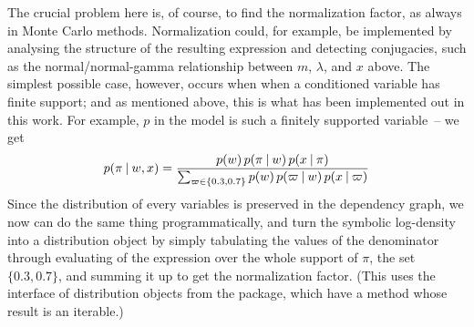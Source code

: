 The crucial problem here is, of course, to find the normalization factor, as always in Monte Carlo
methods.  Normalization could, for example, be implemented by analysing the structure of the
resulting expression and detecting conjugacies, such as the normal/normal-gamma relationship between
\(m\), \(\lambda\), and \(x\) above.  The simplest possible case, however, occurs when when a
conditioned variable has finite support; and as mentioned above, this is what has been implemented
out in this work.  For example, \(p\) in the  model is such a finitely
supported variable~-- we get
\begin{equation}
    p(\pi \:\vert\: w, x) = \frac{p(w) \, p(\pi \:\vert\: w) \, p(x \:\vert\: \pi)}{
      \sum_{\varpi \in \{0.3, 0.7\}}p(w) \, p(\varpi \:\vert\: w) \, p(x \:\vert\: \varpi)}
\end{equation}
Since the distribution of every variables is preserved in the dependency graph, we now can do the
same thing programmatically, and turn the symbolic log-density into a distribution object by simply
tabulating the values of the denominator through evaluating of the expression over the whole support
of \(\pi\), the set \(\{0.3, 0.7\}\), and summing it up to get the normalization factor.  (This uses
the interface of distribution objects from the  package, which have a
 method whose result is an iterable.)

